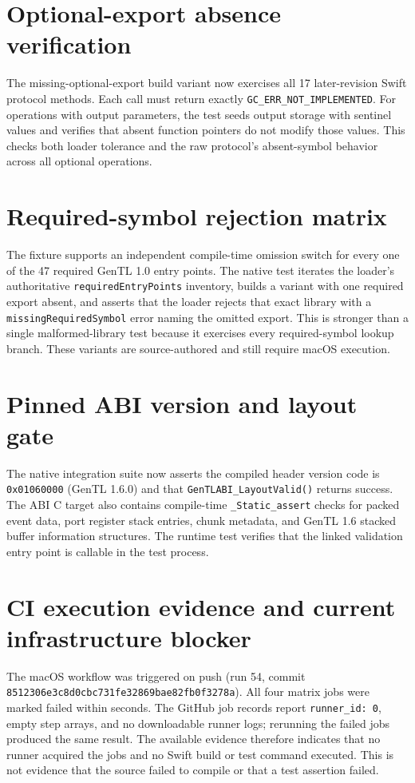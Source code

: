 \documentclass[11pt,a4paper]{report}
\begin{document}
\section{Optional-export absence verification}
The missing-optional-export build variant now exercises all 17 later-revision Swift protocol methods. Each call must return exactly \texttt{GC\_ERR\_NOT\_IMPLEMENTED}. For operations with output parameters, the test seeds output storage with sentinel values and verifies that absent function pointers do not modify those values. This checks both loader tolerance and the raw protocol's absent-symbol behavior across all optional operations.



\section{Required-symbol rejection matrix}
The fixture supports an independent compile-time omission switch for every one of the 47 required GenTL 1.0 entry points. The native test iterates the loader's authoritative \texttt{requiredEntryPoints} inventory, builds a variant with one required export absent, and asserts that the loader rejects that exact library with a \texttt{missingRequiredSymbol} error naming the omitted export. This is stronger than a single malformed-library test because it exercises every required-symbol lookup branch. These variants are source-authored and still require macOS execution.



\section{Pinned ABI version and layout gate}
The native integration suite now asserts the compiled header version code is \texttt{0x01060000} (GenTL 1.6.0) and that \texttt{GenTLABI\_LayoutValid()} returns success. The ABI C target also contains compile-time \texttt{\_Static\_assert} checks for packed event data, port register stack entries, chunk metadata, and GenTL 1.6 stacked buffer information structures. The runtime test verifies that the linked validation entry point is callable in the test process.



\section{CI execution evidence and current infrastructure blocker}
The macOS workflow was triggered on push (run 54, commit \texttt{8512306e3c8d0cbc731fe32869bae82fb0f3278a}). All four matrix jobs were marked failed within seconds. The GitHub job records report \texttt{runner\_id: 0}, empty step arrays, and no downloadable runner logs; rerunning the failed jobs produced the same result. The available evidence therefore indicates that no runner acquired the jobs and no Swift build or test command executed. This is not evidence that the source failed to compile or that a test assertion failed.
\end{document}
